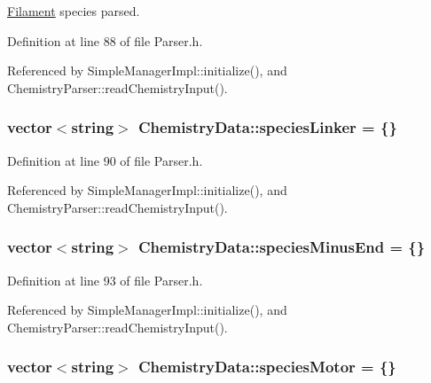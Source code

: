 \hyperlink{classFilament}{Filament} species parsed. 



Definition at line 88 of file Parser.\+h.



Referenced by Simple\+Manager\+Impl\+::initialize(), and Chemistry\+Parser\+::read\+Chemistry\+Input().

\hypertarget{structChemistryData_ab41e13ef134b8cb9066fff74ece920ca}{
\subsubsection[{species\+Linker}]{\setlength{\rightskip}{0pt plus 5cm}vector$<$string$>$ Chemistry\+Data\+::species\+Linker = \{\}}}\label{structChemistryData_ab41e13ef134b8cb9066fff74ece920ca}


Definition at line 90 of file Parser.\+h.



Referenced by Simple\+Manager\+Impl\+::initialize(), and Chemistry\+Parser\+::read\+Chemistry\+Input().

\hypertarget{structChemistryData_a8b638671871e8cc1ef65f2c7429d6254}{
\subsubsection[{species\+Minus\+End}]{\setlength{\rightskip}{0pt plus 5cm}vector$<$string$>$ Chemistry\+Data\+::species\+Minus\+End = \{\}}}\label{structChemistryData_a8b638671871e8cc1ef65f2c7429d6254}


Definition at line 93 of file Parser.\+h.



Referenced by Simple\+Manager\+Impl\+::initialize(), and Chemistry\+Parser\+::read\+Chemistry\+Input().

\hypertarget{structChemistryData_a273fd2565deae219bbd1fe3d557f53ba}{
\subsubsection[{species\+Motor}]{\setlength{\rightskip}{0pt plus 5cm}vector$<$string$>$ Chemistry\+Data\+::species\+Motor = \{\}}}\label{structChemistryData_a273fd2565deae219bbd1fe3d557f53ba}


